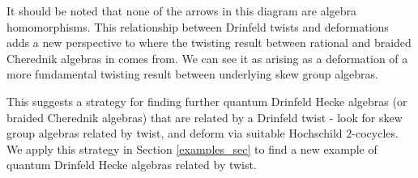 \documentclass[10pt]{article}
\newcommand{\bb}{\medbreak}
\newcommand{\nt}{\noindent}
\theoremstyle{definition}
\begin{document}

\nt It should be noted that none of the arrows in this diagram are algebra homomorphisms. This relationship between Drinfeld twists and deformations adds a new perspective to where the twisting result between rational and braided Cherednik algebras in \cite{twistsrcas} comes from. We can see it as arising as a deformation of a more fundamental twisting result between underlying skew group algebras.\bb

\nt This suggests a strategy for finding further quantum Drinfeld Hecke algebras (or braided Cherednik algebras) that are related by a Drinfeld twist - look for skew group algebras related by twist, and deform via suitable Hochschild $2$-cocycles. We apply this strategy in Section \ref{examples_sec} to find a new example of quantum Drinfeld Hecke algebras related by twist.
\end{document}
